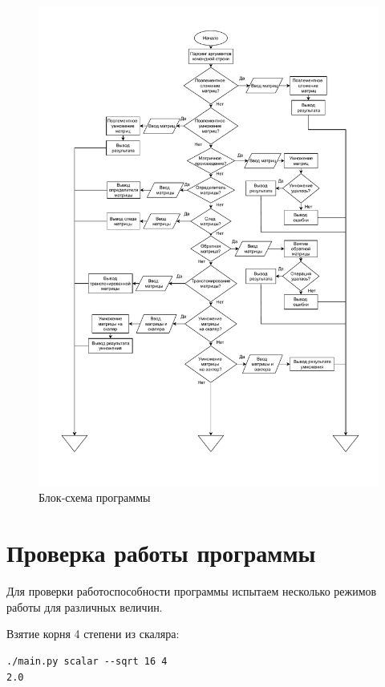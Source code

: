 \documentclass[a4paper,14pt]{extarticle}
\begin{document}
\begin{figure}[H]
	\includegraphics[page=3, width=\textwidth]{include/block_scheme.pdf}
	\caption{Блок-схема программы}
\end{figure}

\newpage

\section{Проверка работы программы}
Для проверки работоспособности программы испытаем 
несколько режимов работы для различных величин.

\vspace{0.1cm}

Взятие корня 4 степени из скаляра:
\begin{verbatim}
./main.py scalar --sqrt 16 4
2.0
\end{verbatim}
 
\end{document}
